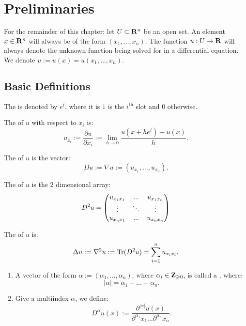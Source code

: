 \chapter{Preliminaries}
\vspace{-25pt}

For the remainder of this chapter: let $U \subset \mathbf{R}^n$ be an open set. An element $x \in \mathbf{R}^n$ will always be of the form $(x_1,\ldots,x_{n})$. The function $u:U \rightarrow \mathbf{R}$ will always denote the unknown function being solved for in a differential equation. We denote $u := u(x) = u(x_1,\ldots,x_{n})$.


\section{Basic Definitions}

\begin{definition}
	The  is denoted by $e^i$, where it is $1$ is the $i^\text{th}$ slot and $0$ otherwise.
\end{definition}

\begin{definition}
	The  of $u$ with respect to $x_i$ is:
	\[
		u_{x_i} := \frac{\partial u}{\partial x_i} := \lim_{h \rightarrow 0} \frac{u(x+he^i) - u(x)}{h}.
	\] 
\end{definition}

\begin{definition}
	The  of $u$ is the vector:
	\[
		Du := \nabla u := (u_{x_1},\ldots,u_{x_n}).
	\] 
\end{definition}

\begin{definition}
	The   of $u$ is the 2 dimensional array:
	\[
		D^{2}u = \left( \begin{matrix} u_{x_1 x_1} & ... & u_{x_1 x_{n}} \\ \vdots & \ddots & \vdots \\ u_{x_{n} x_1} & ... & u_{x_{n} x_{n}} \end{matrix} \right)
	\] 
\end{definition}

\begin{definition}
	The  of $u$ is:
	\[
		\Delta u := \nabla^2 u := \operatorname{Tr}(D^2 u) = \sum_{i=1}^{n} u_{x_i x_i}.
	\] 
\end{definition}

\begin{definition}
	\phantom{a}
	\begin{enumerate}[label = (\alph*),itemsep=1pt,topsep=3pt]
		\item A vector of the form $\alpha := (\alpha_1,\ldots,\alpha_{n})$, where $\alpha_i \in \mathbf{Z}_{\geqslant 0}$, is called a , where:
			\[
				|\alpha| = \alpha_1 + \ldots +\alpha_n.
			\]

		\item Give a multiindex $\alpha$, we define:
			\[
				D^\alpha u(x) := \frac{\partial^{|\alpha|}u(x)}{\partial^{\alpha_1}x_1\ldots\partial^{\alpha_n}x_n}.
			\] 
	\end{enumerate}
\end{definition}

